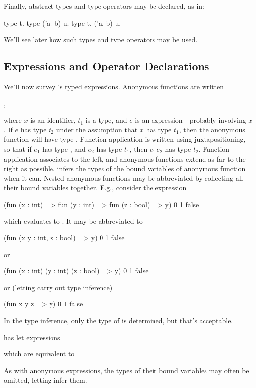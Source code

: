Finally, abstract types and type operators may be declared, as in:
\begin{easycrypt}{}{}
type t.
type ('a, b) u.
type t, ('a, b) u.
\end{easycrypt}
We'll see later how such types and type operators may be used.

\subsection{Expressions and Operator Declarations}
\label{subsec:expressions}

We'll now survey \EasyCrypt's typed expressions. Anonymous functions
are written
\begin{center}
,  
\end{center}
where $x$ is an identifier,
$t_1$ is a type, and $e$ is an expression---probably involving $x$.
If $e$ has type $t_2$ under the assumption that $x$ has type $t_1$,
then the anonymous function will have type .
Function application is written using juxtapositioning, so that if
$e_1$ has type , and $e_2$ has type $t_1$, then
$e_1\,e_2$ has type $t_2$. Function application associates to the
left, and anonymous functions extend as far to the right as possible.
\EasyCrypt infers the types of the bound variables of anonymous function
when it can. Nested anonymous functions may be abbreviated by
collecting all their bound variables together. E.g., consider the
expression
\begin{easycrypt}{}{}
(fun (x : int) => fun (y : int) => fun (z : bool) => y) 0 1 false
\end{easycrypt}
which evaluates to . It may be abbreviated to
\begin{easycrypt}{}{}
(fun (x y : int, z : bool) => y) 0 1 false
\end{easycrypt}
or
\begin{easycrypt}{}{}
(fun (x : int) (y : int) (z : bool) => y) 0 1 false
\end{easycrypt}
or (letting \EasyCrypt carry out type inference)
\begin{easycrypt}{}{}
(fun x y z => y) 0 1 false
\end{easycrypt}
In the type inference, only the type of  is determined, but
that's acceptable.

\EasyCrypt has let expressions
\begin{center}
\end{center}
which are equivalent to
\begin{center}
\end{center}
As with anonymous expressions, the types of their bound variables may
often be omitted, letting \EasyCrypt infer them.

